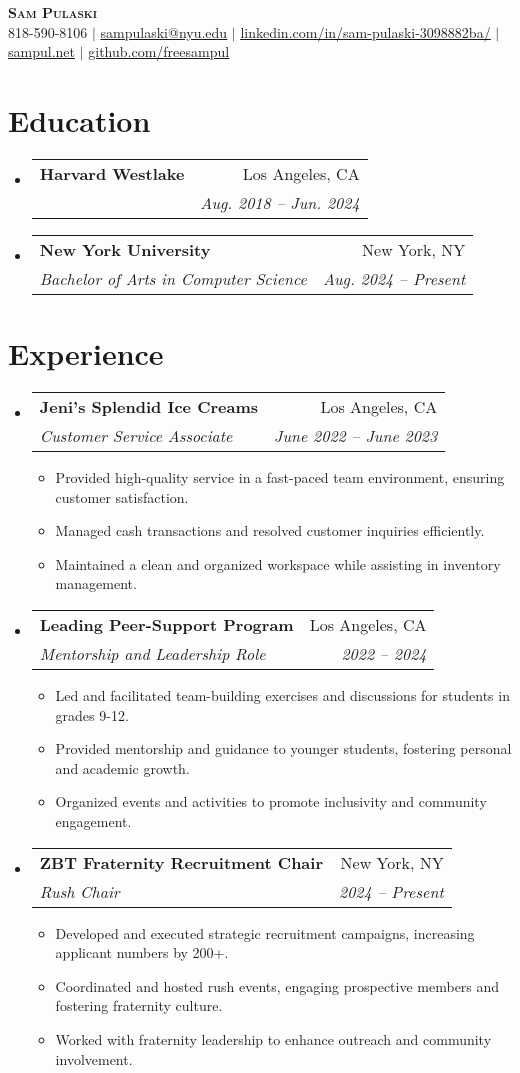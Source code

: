 \documentclass[letterpaper,11pt]{article}
\makeatletter
\newcommand{\resumeItem}[1]{\item\small{#1 \vspace{-2pt}}}
\newcommand{\resumeSubheading}[4]{
  \vspace{-2pt}\item
    \begin{tabular*}{0.97\textwidth}[t]{l@{\extracolsep{\fill}}r}
      \textbf{#1} & #2 \\
      \textit{\small#3} & \textit{\small #4} \\
    \end{tabular*}\vspace{-5pt}
}
\newcommand{\resumeItemListStart}{\begin{itemize}[leftmargin=0.15in]}
\newcommand{\resumeItemListEnd}{\end{itemize}\vspace{-5pt}}
\makeatother
\begin{document}
\begin{center}
    \textbf{\Huge \scshape Sam Pulaski} \\ \vspace{1pt}
    \small 818-590-8106 $|$ \href{mailto:sampulaski@nyu.edu}{\underline{sampulaski@nyu.edu}} $|$ 
    \href{linkedin.com/in/sam-pulaski-3098882ba/}{\underline{linkedin.com/in/sam-pulaski-3098882ba/}} $|$
    \href{sampul.net}{\underline{sampul.net}} $|$
    \href{https://github.com/freesampul}{\underline{github.com/freesampul}}
\end{center}

\section{Education}
\resumeItemListStart
  \resumeSubheading{Harvard Westlake}{Los Angeles, CA}
    {}{Aug. 2018 -- Jun. 2024}
  \resumeSubheading{New York University}{New York, NY}
    {Bachelor of Arts in Computer Science}{Aug. 2024 -- Present}
\resumeItemListEnd

\section{Experience}
\resumeItemListStart
  \resumeSubheading{Jeni’s Splendid Ice Creams}{Los Angeles, CA}
    {Customer Service Associate}{June 2022 -- June 2023}
    \resumeItemListStart
      \resumeItem{Provided high-quality service in a fast-paced team environment, ensuring customer satisfaction.}
      \resumeItem{Managed cash transactions and resolved customer inquiries efficiently.}
      \resumeItem{Maintained a clean and organized workspace while assisting in inventory management.}
    \resumeItemListEnd

  \resumeSubheading{Leading Peer-Support Program}{Los Angeles, CA}
    {Mentorship and Leadership Role}{2022 -- 2024}
    \resumeItemListStart
      \resumeItem{Led and facilitated team-building exercises and discussions for students in grades 9-12.}
      \resumeItem{Provided mentorship and guidance to younger students, fostering personal and academic growth.}
      \resumeItem{Organized events and activities to promote inclusivity and community engagement.}
    \resumeItemListEnd

  \resumeSubheading{ZBT Fraternity Recruitment Chair}{New York, NY}
    {Rush Chair}{2024 -- Present}
    \resumeItemListStart
      \resumeItem{Developed and executed strategic recruitment campaigns, increasing applicant numbers by 200+.}
      \resumeItem{Coordinated and hosted rush events, engaging prospective members and fostering fraternity culture.}
      \resumeItem{Worked with fraternity leadership to enhance outreach and community involvement.}
    \resumeItemListEnd
\resumeItemListEnd
\end{document}
